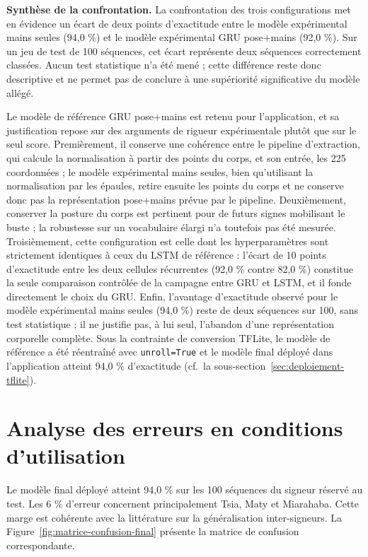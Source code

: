 \textbf{Synthèse de la confrontation.}
La confrontation des trois configurations met en évidence un écart de deux points d'exactitude entre le modèle expérimental mains seules (94,0 \%) et le modèle expérimental GRU pose+mains (92,0 \%). Sur un jeu de test de 100 séquences, cet écart représente deux séquences correctement classées. Aucun test statistique n'a été mené ; cette différence reste donc descriptive et ne permet pas de conclure à une supériorité significative du modèle allégé.

Le modèle de référence GRU pose+mains est retenu pour l'application, et sa justification repose sur des arguments de rigueur expérimentale plutôt que sur le seul score. Premièrement, il conserve une cohérence entre le pipeline d'extraction, qui calcule la normalisation à partir des points du corps, et son entrée, les 225 coordonnées ; le modèle expérimental mains seules, bien qu'utilisant la normalisation par les épaules, retire ensuite les points du corps et ne conserve donc pas la représentation pose+mains prévue par le pipeline. Deuxièmement, conserver la posture du corps est pertinent pour de futurs signes mobilisant le buste ; la robustesse sur un vocabulaire élargi n'a toutefois pas été mesurée. Troisièmement, cette configuration est celle dont les hyperparamètres sont strictement identiques à ceux du LSTM de référence : l'écart de 10 points d'exactitude entre les deux cellules récurrentes (92,0 \% contre 82,0 \%) constitue la seule comparaison contrôlée de la campagne entre GRU et LSTM, et il fonde directement le choix du GRU. Enfin, l'avantage d'exactitude observé pour le modèle expérimental mains seules (94,0 \%) reste de deux séquences sur 100, sans test statistique ; il ne justifie pas, à lui seul, l'abandon d'une représentation corporelle complète. Sous la contrainte de conversion TFLite, le modèle de référence a été réentraîné avec \texttt{unroll=True} et le modèle final déployé dans l'application atteint 94,0 \% d'exactitude (cf.\ la sous-section~\ref{sec:deploiement-tflite}).

\section{Analyse des erreurs en conditions d'utilisation}

Le modèle final déployé atteint 94,0 \% sur les 100 séquences du signeur réservé au test. Les 6 \% d'erreur concernent principalement Tsia, Maty et Miarahaba. Cette marge est cohérente avec la littérature sur la généralisation inter-signeurs. La Figure~\ref{fig:matrice-confusion-final} présente la matrice de confusion correspondante.

